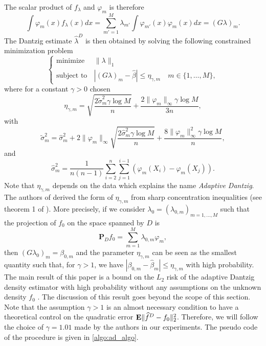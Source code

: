 The scalar product of $f_{\lambda}$ and $\varphi_m$ is therefore
\begin{equation}
    \int\varphi_m(x)f_{\lambda}(x)dx = \sum_{m'=1}^M\lambda_{m'}\int\varphi_{m'}(x)\varphi_m(x)dx = (G\lambda)_m.
\end{equation}
The Dantzig estimate $\hat\lambda^D$ is then obtained by solving the following constrained minimization problem
\begin{equation*}
    \left\{
    \begin{array}{ll}
        \text{minimize}\, &\|\lambda\|_1 \\
        \text{subject to}\, &|(G\lambda)_m-\hat\beta|\leq \eta_{\gamma,m} \quad m\in \{1,\dots,M\},
    \end{array} \right.
\end{equation*}
where for a constant $\gamma > 0$ chosen 
\begin{equation}
    \eta_{\gamma,m} = \sqrt{\frac{2\tilde\sigma_m^2\gamma\log{M}}{n}}+ \frac{2\|\varphi_m\|_{\infty}\gamma\log{M}}{3n},
\end{equation}
with
\begin{equation}
    \tilde\sigma_m^2 = \hat\sigma_m^2+2\|\varphi_m \|_{\infty}\sqrt{\frac{2\hat\sigma_m^2\gamma\log{M}}{n}}+ \frac{8\|\varphi_m\|_{\infty}^2\gamma\log{M}}{n},
\end{equation}
and
\begin{equation}
    \hat\sigma^2_m = \frac{1}{n(n-1)}\sum_{i=2}^n\sum_{j=1}^{i-1}(\varphi_m(X_i)-\varphi_m(X_j)).
\end{equation}
Note that $\eta_{\gamma,m}$ depends on the data which explains the name \textit{Adaptive Dantzig}. The authors of \cite{Bertin} derived the form of $\eta_{\gamma,m}$ from sharp concentration inequalities (see theorem 1 of \cite{Bertin}). More precisely, if we consider $\lambda_0=(\lambda_{0,m})_{m=1,\dots,M}$ such that the projection of $f_0$ on the space spanned by $D$ is
\begin{equation}
    \textbf{P}_{D}f_0=\sum_{m=1}^M\lambda_{0,m}\varphi_m,
\end{equation}
then $(G\lambda_0)_m=\beta_{0,m}$  and the parameter $\eta_{\gamma,m}$ can be seen as the smallest quantity such that, for $\gamma > 1$, we have $|\beta_{0,m}-\hat\beta_m|\leq \eta_{\gamma,m}$ with high probability. The main result of this paper is a bound on the $L_2$ risk of the adaptive Dantzig density estimator with high probability without any assumptions on the unknown density $f_0$ . The discussion of this result goes beyond the scope of this section. Note that the assumption $\gamma > 1$ is an almost necessary condition to have a theoretical control on the quadratic error $\mathbf E\|\widehat f^D-f_0 \|^2_2$. Therefore, we will follow the choice of $\gamma=1.01$ made by the authors in our experiments. The pseudo code of the procedure is given in \cref{algo:ad_algo}. 

